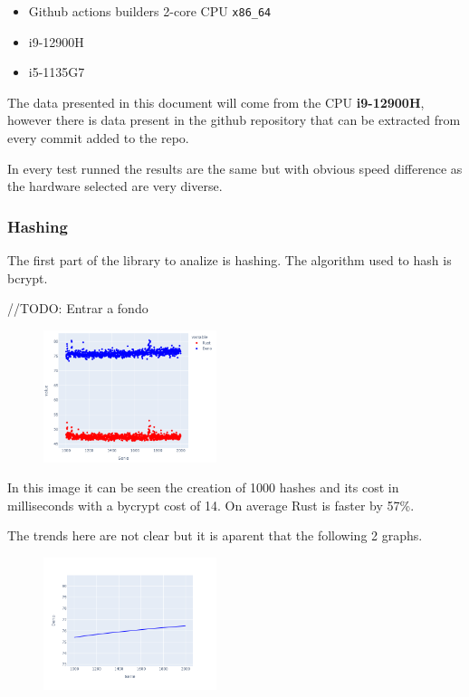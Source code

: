 \documentclass[12pt, letterpaper]{article}
\begin{document}
\begin{multicols}{2}
    \begin{itemize}
        \item Github actions builders 2-core CPU \verb|x86_64|
        \item i9-12900H
        \item i5-1135G7
    \end{itemize}

    The data presented in this document will come from the CPU \textbf{i9-12900H}, however there is data present in the github repository that can be extracted from every commit added to the repo.

    In every test runned the results are the same but with obvious speed difference as the hardware selected are very diverse.

    \subsubsection{Hashing}

    The first part of the library to analize is hashing. The algorithm used to hash is bcrypt.

    //TODO: Entrar a fondo

    \begin{figure}[H]
        \centering
        \includegraphics[width=0.45\textwidth]{hashing_lines}
    \end{figure}

    In this image it can be seen the creation of 1000 hashes and its cost in milliseconds with a bycrypt cost of 14. On average Rust is faster by 57\%.

    The trends here are not clear but it is aparent that the following 2 graphs.

    \begin{figure}[H]
        \centering
        \includegraphics[width=0.45\textwidth]{trend_hash_deno}
    \end{figure}


\end{multicols}
\end{document}
